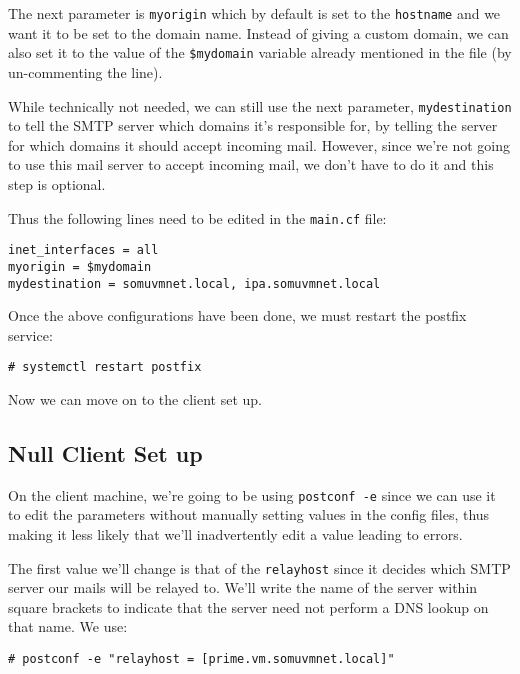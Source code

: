The next parameter is \verb|myorigin| which by default is set to the \verb|hostname| and we want it to be set to the domain name. Instead of giving a custom domain, we can also set it to the value of the \verb|$mydomain| variable already mentioned in the file (by un-commenting the line).

While technically not needed, we can still use the next parameter, \verb|mydestination| to tell the SMTP server which domains it's responsible for, by telling the server for which domains it should accept incoming mail. However, since we're not going to use this mail server to accept incoming mail, we don't have to do it and this step is optional. 

Thus the following lines need to be edited in the \verb|main.cf| file:

\vspace{-15pt}
\begin{verbatim}
inet_interfaces = all
myorigin = $mydomain
mydestination = somuvmnet.local, ipa.somuvmnet.local
\end{verbatim}
\vspace{-10pt}	

\noindent
Once the above configurations have been done, we must restart the postfix service:

\vspace{-15pt}
\begin{verbatim}
# systemctl restart postfix
\end{verbatim}
\vspace{-10pt}	

\noindent
Now we can move on to the client set up.

\subsection{Null Client Set up}
On the client machine, we're going to be using \verb|postconf -e| since we can use it to edit the parameters without manually setting values in the config files, thus making it less likely that we'll inadvertently edit a value leading to errors. 

The first value we'll change is that of the \verb|relayhost| since it decides which SMTP server our mails will be relayed to. We'll write the name of the server within square brackets to indicate that the server need not perform a DNS lookup on that name. We use:

\vspace{-15pt}
\begin{verbatim}
# postconf -e "relayhost = [prime.vm.somuvmnet.local]"
\end{verbatim}
\vspace{-10pt}	

